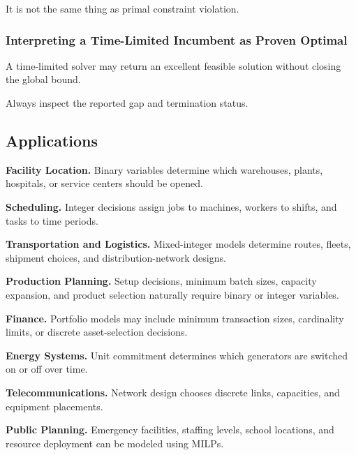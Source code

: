 It is not the same thing as primal constraint violation.

\subsubsection{Interpreting a Time-Limited Incumbent as Proven Optimal}

A time-limited solver may return an excellent feasible solution without
closing the global bound.

Always inspect the reported gap and termination status.

\subsection{Applications}
\label{subsec:integer-programming-applications}

\begin{applicationbox}

\textbf{Facility Location.}
Binary variables determine which warehouses, plants, hospitals, or
service centers should be opened.

\medskip

\textbf{Scheduling.}
Integer decisions assign jobs to machines, workers to shifts, and tasks
to time periods.

\medskip

\textbf{Transportation and Logistics.}
Mixed-integer models determine routes, fleets, shipment choices, and
distribution-network designs.

\medskip

\textbf{Production Planning.}
Setup decisions, minimum batch sizes, capacity expansion, and product
selection naturally require binary or integer variables.

\medskip

\textbf{Finance.}
Portfolio models may include minimum transaction sizes, cardinality
limits, or discrete asset-selection decisions.

\medskip

\textbf{Energy Systems.}
Unit commitment determines which generators are switched on or off over
time.

\medskip

\textbf{Telecommunications.}
Network design chooses discrete links, capacities, and equipment
placements.

\medskip

\textbf{Public Planning.}
Emergency facilities, staffing levels, school locations, and resource
deployment can be modeled using MILPs.

\end{applicationbox}

